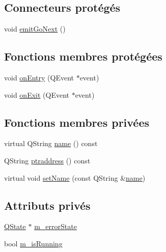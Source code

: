 \subsection*{Connecteurs protégés}
\begin{DoxyCompactItemize}
\item 
void \hyperlink{classSH__GenericStateMachine_a2e162a1da1f694d433cb9072b37ac530}{emit\-Go\-Next} ()
\end{DoxyCompactItemize}
\subsection*{Fonctions membres protégées}
\begin{DoxyCompactItemize}
\item 
void \hyperlink{classSH__GenericStateMachine_adfd82f2532595ed7c4bcf21f03cbb951}{on\-Entry} (Q\-Event $\ast$event)
\item 
void \hyperlink{classSH__GenericStateMachine_a4b36d60fa1876908493d3d07f191a30f}{on\-Exit} (Q\-Event $\ast$event)
\end{DoxyCompactItemize}
\subsection*{Fonctions membres privées}
\begin{DoxyCompactItemize}
\item 
virtual Q\-String \hyperlink{classSH__NamedObject_a9f686c6f2a5bcc08ad03d0cee0151f0f}{name} () const 
\item 
Q\-String \hyperlink{classSH__NamedObject_a147d0e52d9f0fc1d3a423d02f82325f5}{ptraddress} () const 
\item 
virtual void \hyperlink{classSH__NamedObject_a6bc164e6fa10ae190770529af75d1775}{set\-Name} (const Q\-String \&\hyperlink{classSH__NamedObject_a9f686c6f2a5bcc08ad03d0cee0151f0f}{name})
\end{DoxyCompactItemize}
\subsection*{Attributs privés}
\begin{DoxyCompactItemize}
\item 
\hyperlink{classQState}{Q\-State} $\ast$ \hyperlink{classSH__GenericStateMachine_acdf020d8c235f727096da9e613d7e4d7}{m\-\_\-error\-State}
\item 
bool \hyperlink{classSH__GenericStateMachine_ad03681101e09322e6a2ebb1703bc647b}{m\-\_\-is\-Running}
\end{DoxyCompactItemize}


